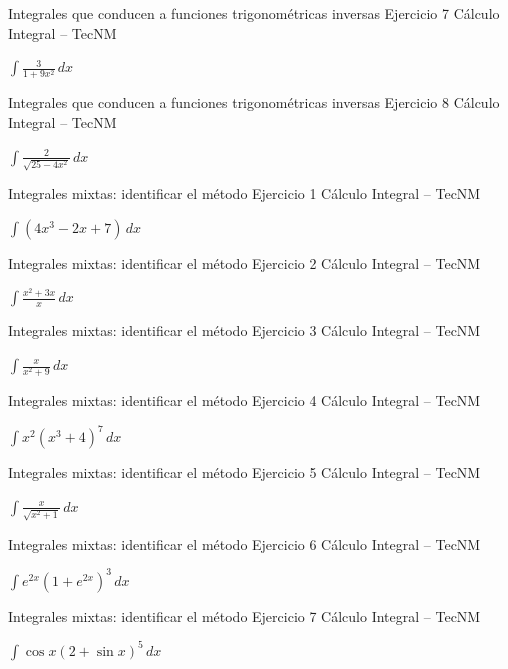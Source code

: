 \documentclass[aspectratio=169,12pt]{beamer}
\newcommand{\ejercicio}[1]{%
  \begin{center}
  \vfill
  {\fontsize{24}{30}\selectfont #1}
  \vfill
  \end{center}
}
\begin{document}
\begin{frame}{Integrales que conducen a funciones trigonométricas inversas}
\small Ejercicio 7 \hfill Cálculo Integral -- TecNM
\ejercicio{$\displaystyle \int\frac{3}{1+9x^2}\,dx$}
\end{frame}

\begin{frame}{Integrales que conducen a funciones trigonométricas inversas}
\small Ejercicio 8 \hfill Cálculo Integral -- TecNM
\ejercicio{$\displaystyle \int\frac{2}{\sqrt{25-4x^2}}\,dx$}
\end{frame}

\begin{frame}{Integrales mixtas: identificar el método}
\small Ejercicio 1 \hfill Cálculo Integral -- TecNM
\ejercicio{$\displaystyle \int(4x^3-2x+7)\,dx$}
\end{frame}

\begin{frame}{Integrales mixtas: identificar el método}
\small Ejercicio 2 \hfill Cálculo Integral -- TecNM
\ejercicio{$\displaystyle \int\frac{x^2+3x}{x}\,dx$}
\end{frame}

\begin{frame}{Integrales mixtas: identificar el método}
\small Ejercicio 3 \hfill Cálculo Integral -- TecNM
\ejercicio{$\displaystyle \int\frac{x}{x^2+9}\,dx$}
\end{frame}

\begin{frame}{Integrales mixtas: identificar el método}
\small Ejercicio 4 \hfill Cálculo Integral -- TecNM
\ejercicio{$\displaystyle \int x^2(x^3+4)^7\,dx$}
\end{frame}

\begin{frame}{Integrales mixtas: identificar el método}
\small Ejercicio 5 \hfill Cálculo Integral -- TecNM
\ejercicio{$\displaystyle \int\frac{x}{\sqrt{x^2+1}}\,dx$}
\end{frame}

\begin{frame}{Integrales mixtas: identificar el método}
\small Ejercicio 6 \hfill Cálculo Integral -- TecNM
\ejercicio{$\displaystyle \int e^{2x}(1+e^{2x})^3\,dx$}
\end{frame}

\begin{frame}{Integrales mixtas: identificar el método}
\small Ejercicio 7 \hfill Cálculo Integral -- TecNM
\ejercicio{$\displaystyle \int\cos x(2+\sin x)^5\,dx$}
\end{frame}
\end{document}
